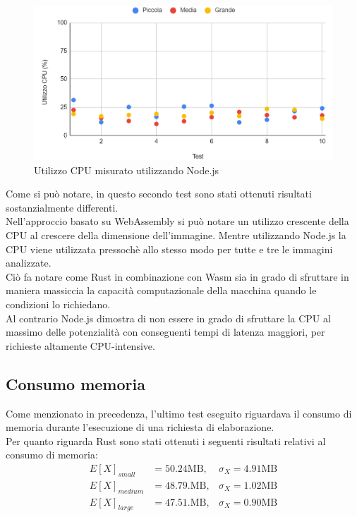 \begin{figure}
    \begin{center}
            \includegraphics[width=1\columnwidth]{images/node_cpu.png}
    \end{center}
    \caption{Utilizzo CPU misurato utilizzando Node.js}
\end{figure}
Come si può notare, in questo secondo test sono stati ottenuti risultati sostanzialmente differenti.
\\Nell'approccio basato su WebAssembly si può notare un utilizzo crescente della CPU al crescere della dimensione dell'immagine. Mentre utilizzando Node.js la CPU viene utilizzata pressochè allo stesso modo per tutte e tre le immagini analizzate.
\\Ciò fa notare come Rust in combinazione con Wasm sia in grado di sfruttare in maniera massiccia la capacità computazionale della macchina quando le condizioni lo richiedano.
\\Al contrario Node.js dimostra di non essere in grado di sfruttare la CPU al massimo delle potenzialità con conseguenti tempi di latenza maggiori, per richieste altamente CPU-intensive.
\newpage\subsection{Consumo memoria}
Come menzionato in precedenza, l'ultimo test eseguito riguardava il consumo di memoria durante l'esecuzione di una richiesta di elaborazione. 
\\Per quanto riguarda Rust sono stati ottenuti i seguenti risultati relativi al consumo di memoria:
\begin{align*}
    E[X]_{small}&=50.24\text{MB},  & \sigma_X=4.91\text{MB}\\
    E[X]_{medium}&=48.79.\text{MB},  & \sigma_X=1.02\text{MB}\\
    E[X]_{large}&=47.51.\text{MB},  & \sigma_X=0.90\text{MB}\\
\end{align*}
